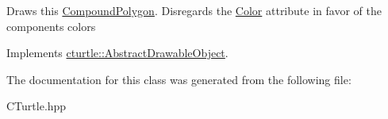 Draws this \hyperlink{classcturtle_1_1CompoundPolygon}{Compound\+Polygon}. Disregards the \hyperlink{classcturtle_1_1Color}{Color} attribute in favor of the components\textquotesingle{} colors 

Implements \hyperlink{classcturtle_1_1AbstractDrawableObject_a7b1ad1e9743d343e0fe577de3978bdad}{cturtle\+::\+Abstract\+Drawable\+Object}.



The documentation for this class was generated from the following file\+:\begin{DoxyCompactItemize}
\item 
C\+Turtle.\+hpp\end{DoxyCompactItemize}
